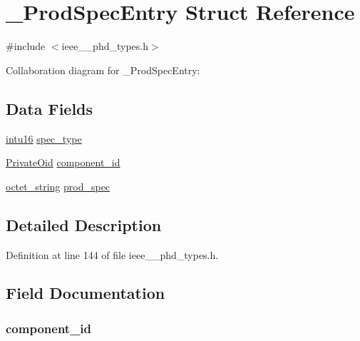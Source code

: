 \hypertarget{struct___prod_spec_entry}{}\section{\+\_\+\+Prod\+Spec\+Entry Struct Reference}
\label{struct___prod_spec_entry}


{\ttfamily \#include $<$ieee\+\_\+\_\+phd\+\_\+types.\+h$>$}



Collaboration diagram for \+\_\+\+Prod\+Spec\+Entry\+:
\subsection*{Data Fields}
\begin{DoxyCompactItemize}
\item 
\hyperlink{ieee__11073__phd__types_8h_a3561595d2aa7416532e1c9910abd076d}{intu16} \hyperlink{struct___prod_spec_entry_a143d17b9a4e6eba50de309f8324f1083}{spec\+\_\+type}
\item 
\hyperlink{ieee__11073__phd__types_8h_a379ea6d22ca9f5b77bf687997cb6f3e7}{Private\+Oid} \hyperlink{struct___prod_spec_entry_a7bba0071a018d4f1520fa70f2ff1774f}{component\+\_\+id}
\item 
\hyperlink{ieee__11073__phd__types_8h_a5524261dd425fc0bd90c9d87277b7127}{octet\+\_\+string} \hyperlink{struct___prod_spec_entry_aa71966d0c6b26c6063fe114ae02e9a9a}{prod\+\_\+spec}
\end{DoxyCompactItemize}


\subsection{Detailed Description}


Definition at line 144 of file ieee\+\_\+\_\+phd\+\_\+types.\+h.



\subsection{Field Documentation}
\hypertarget{struct___prod_spec_entry_a7bba0071a018d4f1520fa70f2ff1774f}{}
\subsubsection[{component\+\_\+id}]{ component\+\_\+id}\label{struct___prod_spec_entry_a7bba0071a018d4f1520fa70f2ff1774f}


